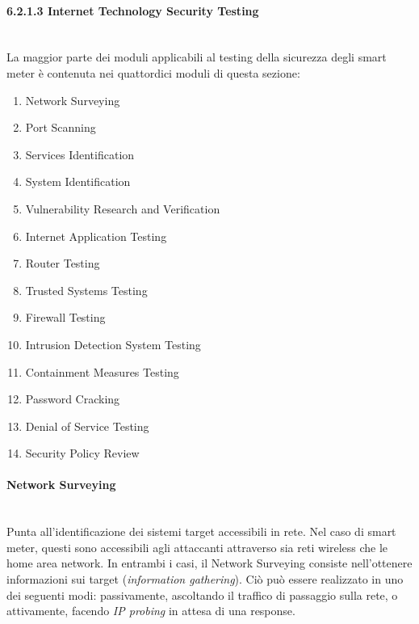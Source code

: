\paragraph{6.2.1.3 Internet Technology Security Testing}\mbox{}\\
La maggior parte dei moduli applicabili al testing della sicurezza degli smart meter è contenuta nei quattordici moduli di questa sezione:
\begin{enumerate}
	\item Network Surveying
	\item Port Scanning
	\item Services Identification
	\item System Identification
	\item Vulnerability Research and Verification
	\item Internet Application Testing
	\item Router Testing
	\item Trusted Systems Testing
	\item Firewall Testing
	\item Intrusion Detection System Testing
	\item Containment Measures Testing
	\item Password Cracking
	\item Denial of Service Testing
	\item Security Policy Review
\end{enumerate}

\paragraph{Network Surveying}\mbox{}\\
Punta all'identificazione dei sistemi target accessibili in rete. Nel caso di smart meter, questi sono accessibili agli attaccanti attraverso sia reti wireless che le home area network. In entrambi i casi, il Network Surveying consiste nell'ottenere informazioni sui target (\emph{information gathering}).
Ciò può essere realizzato in uno dei seguenti modi: passivamente, ascoltando il traffico di passaggio sulla rete, o attivamente, facendo \emph{IP probing} in attesa di una response.\\

